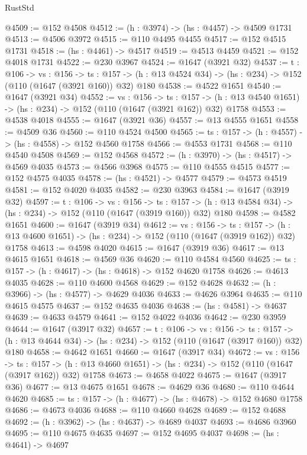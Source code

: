 \begin{lexlean}{RustStd}
\begin{coremodule}
@4509 := @152 @4508
@4512 := (h : @3974) -> (hs : @4457) -> @4509 @1731
@4513 := @4506 @3972
@4515 := @110 @4495 @4455
@4517 := @152 @4515 @1731
@4518 := (hs : @4461) -> @4517
@4519 := @4513 @4459
@4521 := @152 @4018 @1731
@4522 := @230 @3967
@4524 := @1647 (@3921 @32)
@4537 := {t : @106} ->
  {vs : @156} ->
  {ts : @157} -> (h : @13 @4524 @34) -> (hs : @234) -> @152 (@110 (@1647 (@3921 @160)) @32) @180
@4538 := @4522 @1651
@4540 := @1647 (@3921 @34)
@4552 := {vs : @156} ->
  {ts : @157} -> (h : @13 @4540 @1651) -> (hs : @234) -> @152 (@110 (@1647 (@3921 @162)) @32) @1758
@4553 := @4538 @4018
@4555 := @1647 (@3921 @36)
@4557 := @13 @4555 @1651
@4558 := @4509 @36
@4560 := @110 @4524 @4500
@4565 := {ts : @157} -> (h : @4557) -> (hs : @4558) -> @152 @4560 @1758
@4566 := @4553 @1731
@4568 := @110 @4540 @4508
@4569 := @152 @4568
@4572 := (h : @3970) -> (hs : @4517) -> @4569 @4035
@4573 := @4566 @3968
@4575 := @110 @4555 @4515
@4577 := @152 @4575 @4035
@4578 := (hs : @4521) -> @4577
@4579 := @4573 @4519
@4581 := @152 @4020 @4035
@4582 := @230 @3963
@4584 := @1647 (@3919 @32)
@4597 := {t : @106} ->
  {vs : @156} ->
  {ts : @157} -> (h : @13 @4584 @34) -> (hs : @234) -> @152 (@110 (@1647 (@3919 @160)) @32) @180
@4598 := @4582 @1651
@4600 := @1647 (@3919 @34)
@4612 := {vs : @156} ->
  {ts : @157} -> (h : @13 @4600 @1651) -> (hs : @234) -> @152 (@110 (@1647 (@3919 @162)) @32) @1758
@4613 := @4598 @4020
@4615 := @1647 (@3919 @36)
@4617 := @13 @4615 @1651
@4618 := @4569 @36
@4620 := @110 @4584 @4560
@4625 := {ts : @157} -> (h : @4617) -> (hs : @4618) -> @152 @4620 @1758
@4626 := @4613 @4035
@4628 := @110 @4600 @4568
@4629 := @152 @4628
@4632 := (h : @3966) -> (hs : @4577) -> @4629 @4036
@4633 := @4626 @3964
@4635 := @110 @4615 @4575
@4637 := @152 @4635 @4036
@4638 := (hs : @4581) -> @4637
@4639 := @4633 @4579
@4641 := @152 @4022 @4036
@4642 := @230 @3959
@4644 := @1647 (@3917 @32)
@4657 := {t : @106} ->
  {vs : @156} ->
  {ts : @157} -> (h : @13 @4644 @34) -> (hs : @234) -> @152 (@110 (@1647 (@3917 @160)) @32) @180
@4658 := @4642 @1651
@4660 := @1647 (@3917 @34)
@4672 := {vs : @156} ->
  {ts : @157} -> (h : @13 @4660 @1651) -> (hs : @234) -> @152 (@110 (@1647 (@3917 @162)) @32) @1758
@4673 := @4658 @4022
@4675 := @1647 (@3917 @36)
@4677 := @13 @4675 @1651
@4678 := @4629 @36
@4680 := @110 @4644 @4620
@4685 := {ts : @157} -> (h : @4677) -> (hs : @4678) -> @152 @4680 @1758
@4686 := @4673 @4036
@4688 := @110 @4660 @4628
@4689 := @152 @4688
@4692 := (h : @3962) -> (hs : @4637) -> @4689 @4037
@4693 := @4686 @3960
@4695 := @110 @4675 @4635
@4697 := @152 @4695 @4037
@4698 := (hs : @4641) -> @4697

\end{coremodule}
\end{lexlean}
